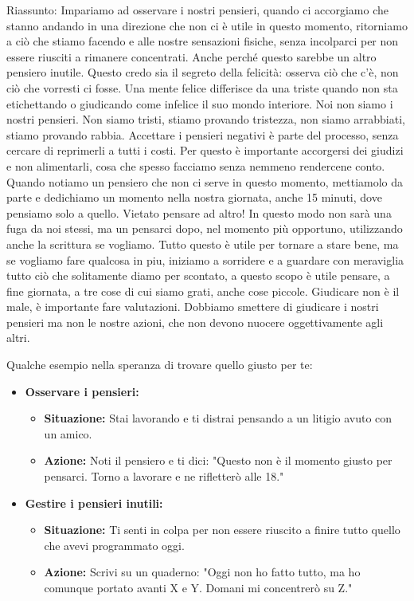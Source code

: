 \documentclass[12pt]{book} %
\begin{document}
\begin{mdframed}[linewidth=1pt]
Riassunto: Impariamo ad osservare i nostri pensieri, quando ci accorgiamo che stanno andando in una direzione che non ci è utile in questo momento, ritorniamo a ciò che stiamo facendo e alle nostre sensazioni fisiche, senza incolparci per non essere riusciti a rimanere concentrati. Anche perché questo sarebbe un altro pensiero inutile. Questo credo sia il segreto della felicità: osserva ciò che c'è, non ciò che vorresti ci fosse. Una mente felice differisce da una triste quando non sta etichettando o giudicando come infelice il suo mondo interiore. Noi non siamo i nostri pensieri. Non siamo tristi, stiamo provando tristezza, non siamo arrabbiati, stiamo provando rabbia. Accettare i pensieri negativi è parte del processo, senza cercare di reprimerli a tutti i costi. Per questo è importante accorgersi dei giudizi e non alimentarli, cosa che spesso facciamo senza nemmeno rendercene conto.
Quando notiamo un pensiero che non ci serve in questo momento, mettiamolo da parte e dedichiamo un momento nella nostra giornata, anche 15 minuti, dove pensiamo solo a quello. Vietato pensare ad altro! In questo modo non sarà una fuga da noi stessi, ma un pensarci dopo, nel momento più opportuno, utilizzando anche la scrittura se vogliamo. Tutto questo è utile per tornare a stare bene, ma se vogliamo fare qualcosa in piu, iniziamo a sorridere e a guardare con meraviglia tutto ciò che solitamente diamo per scontato, a questo scopo è utile pensare, a fine giornata, a tre cose di cui siamo grati, anche cose piccole.
Giudicare non è il male, è importante fare valutazioni. Dobbiamo smettere di giudicare i nostri pensieri ma non le nostre azioni, che non devono nuocere oggettivamente agli altri.

Qualche esempio nella speranza di trovare quello giusto per te:
\begin{itemize}
    \item \textbf{Osservare i pensieri:} 
    \begin{itemize}
        \item \textbf{Situazione:} Stai lavorando e ti distrai pensando a un litigio avuto con un amico.
        \item \textbf{Azione:} Noti il pensiero e ti dici: "Questo non è il momento giusto per pensarci. Torno a lavorare e ne rifletterò alle 18."
    \end{itemize}

    \item \textbf{Gestire i pensieri inutili:} 
    \begin{itemize}
        \item \textbf{Situazione:} Ti senti in colpa per non essere riuscito a finire tutto quello che avevi programmato oggi.
        \item \textbf{Azione:} Scrivi su un quaderno: "Oggi non ho fatto tutto, ma ho comunque portato avanti X e Y. Domani mi concentrerò su Z."
    \end{itemize}


\end{itemize}
\end{mdframed}
\end{document}
